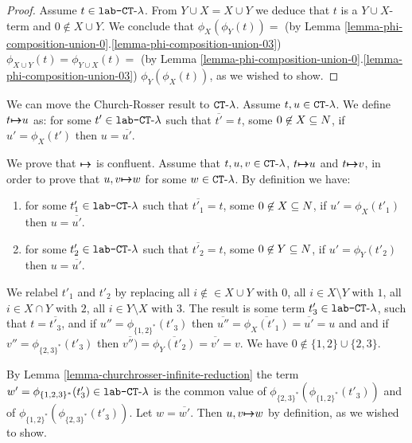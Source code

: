\begin{proof}
Assume $t \in {\mbox{\tt lab-} { {\tt CT}\mbox{-}\lambda} }$.
From $Y \cup X = X \cup Y$ we deduce that $t$ is a $Y \cup X$-term and $0 \not \in X \cup Y$.
We conclude that
$\phi_{X}(\phi_{Y}(t)) = 
$ (by Lemma \ref{lemma-phi-composition-union-0}.\ref{lemma-phi-composition-union-03}) $
\phi_{X \cup Y}(t) = 
\phi_{Y \cup X}(t) = 
$ (by Lemma \ref{lemma-phi-composition-union-0}.\ref{lemma-phi-composition-union-03}) $
\phi_{Y}(\phi_{X}(t))
$, 
as we wished to show.
\end{proof}


We can move the Church-Rosser result to ${ {\tt CT}\mbox{-}\lambda}$. Assume $t, u \in { {\tt CT}\mbox{-}\lambda}$.
We define $t { \mapsto \mspace{-17mu} \mapsto } u$ as: for some $t' \in {\mbox{\tt lab-} { {\tt CT}\mbox{-}\lambda} }$
such that $\overline{t'} = t$, some $0 \not \in X \subseteq {N}$, if $u' = \phi_X(t')$
then $u = \overline{u'}$.


We prove that ${ \mapsto \mspace{-17mu} \mapsto }$ is confluent. 
Assume that $t, u, v \in { {\tt CT}\mbox{-}\lambda}$,  $t { \mapsto \mspace{-17mu} \mapsto } u$ and
$t { \mapsto \mspace{-17mu} \mapsto } v$, in order to prove that  $u,v { \mapsto \mspace{-17mu} \mapsto } w$ for some $w \in { {\tt CT}\mbox{-}\lambda}$.
By definition we have:

\begin{enumerate}
\item
for some $t'_1 \in {\mbox{\tt lab-} { {\tt CT}\mbox{-}\lambda} }$
such that $\overline{t'_1} = t$, some $0 \not \in X \subseteq {N}$, if $u' = \phi_X(t'_1)$
then $u = \overline{u'}$.

\item
for some $t'_2 \in {\mbox{\tt lab-} { {\tt CT}\mbox{-}\lambda} }$
such that $\overline{t'_2} = t$, some $0 \not \in Y \subseteq {N}$, if $u' = \phi_Y(t'_2)$
then $u = \overline{u'}$.

\end{enumerate}
We relabel $t'_1$ and $t'_2$ by replacing 
all $i  \not \in \in X \cup Y$ with $0$, 
all $i \in X \setminus Y$ with $1$, 
all $i \in X \cap Y$ with $2$, 
all $i \in Y \setminus X$ with $3$. 
The result is some term $t'_3 \in {\mbox{\tt lab-} { {\tt CT}\mbox{-}\lambda} }$, such that 
$t = \overline{t'_3}$, and if $u''=\phi_{\{1,2\}^*}(t'_3)$
then $\overline{u''} =  \overline{\phi_{X}(t'_1)} = \overline{u'} = u$
and and if $v''=\phi_{\{2,3\}^*}(t'_3)$
then $\overline{v'')} = 
\overline{\phi_{Y}(t'_2)} =\overline{v'} = v$.
We have $0 \not \in \{1,2\} \cup \{2,3\}$.

By Lemma \ref{lemma-churchrosser-infinite-reduction}
the term $w' = \phi_{\{1,2,3\}^*}(t'_3) \in {\mbox{\tt lab-} { {\tt CT}\mbox{-}\lambda} }$ is the common value of
$\phi_{\{2,3\}^*}(\phi_{\{1,2\}^*}(t'_3))$ and of $\phi_{\{1,2\}^*}(\phi_{\{2,3\}^*}(t'_3))$. 
Let $w = \overline{w'}$. Then $u,v { \mapsto \mspace{-17mu} \mapsto } w$ by definition, as we wished to show.

